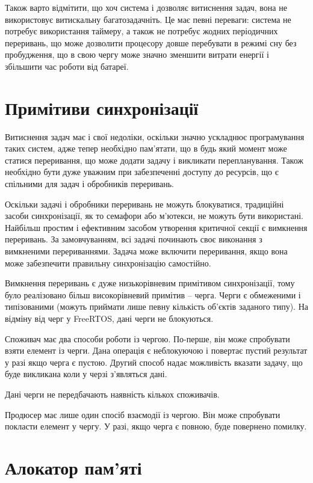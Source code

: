 \documentclass[oneside,14pt,a4paper,final]{myextreport}
\begin{document}
Також варто відмітити, що хоч система і дозволяє витиснення задач, вона не використовує витискальну багатозадачніть. Це має певні переваги: система не потребує використання таймеру, а також не потребує жодних періодичних переривань, що може дозволити процесору довше перебувати в режимі сну без пробудження, що в свою чергу може значно зменшити витрати енергії і збільшити час роботи від батареї.

\section{Примітиви синхронізації}

Витиснення задач має і свої недоліки, оскільки значно ускладнює програмування таких систем, адже тепер необхідно пам'ятати, що в будь який момент може статися переривання, що може додати задачу і викликати перепланування. Також необхідно бути дуже уважним при забезпеченні доступу до ресурсів, що є спільними для задач і обробників переривань.

Оскільки задачі і обробники переривань не можуть блокуватися, традиційні засоби синхронізації, як то семафори або м'ютекси, не можуть бути використані. Найбільш простим і ефективним засобом утворення критичної секції є вимкнення переривань. За замовчуванням, всі задачі починають своє виконання з вимкненими перериваннями. Задача може включити переривання, якщо вона може забезпечити правильну синхронізацію самостійно.

Вимкнення переривань є дуже низькорівневим примітивом синхронізації, тому було реалізовано більш високорівневий примітив -- черга. Черги є обмеженими і типізованими (можуть приймати лише певну кількість об'єктів заданого типу). На відміну від черг у FreeRTOS, дані черги не блокуються.

Споживач має два способи роботи із чергою. По-перше, він може спробувати взяти елемент із черги. Дана операція є неблокуючою і повертає пустий результат у разі якщо черга є пустою. Другий способ надає можливість вказати задачу, що буде викликана коли у черзі з'являться дані.

Дані черги не передбачають наявність кількох споживачів.

Продюсер має лише один спосіб взаємодії із чергою. Він може спробувати покласти елемент у чергу. У разі, якщо черга є повною, буде повернено помилку.

\section{Алокатор пам'яті}
\end{document}
